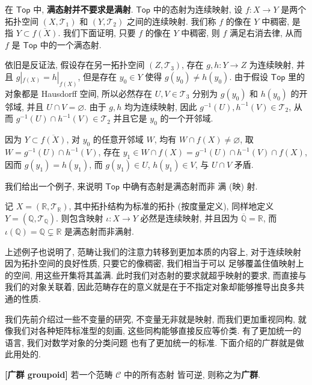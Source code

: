 \documentclass[UTF8]{book}
\begin{document}
\begin{example}
    在 $\mathsf{Top}$ 中, \textbf{满态射并不要求是满射}. 
    $\mathsf{Top}$ 中的态射为连续映射, 设 $f: X \to Y$ 
    是两个拓扑空间 $(X,\mathcal{T}_1)$ 和 $(Y,\mathcal{T}_2)$ 
    之间的连续映射. 
    我们称 $f$ 的像在 $Y$ 中稠密, 是指 $Y \subset \overline{f(X)}$. 
    我们下面证明, 只要 $f$ 的像在 $Y$ 中稠密, 则 $f$ 满足右消去律, 
    从而 $f$ 是 $\mathsf{Top}$ 中的一个满态射. 

    依旧是反证法, 假设存在另一拓扑空间 $(Z,\mathcal{T}_3)$, 
    存在 $g,h : Y \to Z$ 为连续映射, 并且 $g|_{f(X)}=h|_{f(X)}$, 
    但是存在 $y_0 \in Y$ 使得 $g(y_0)\neq h(y_0)$. 
    由于假设 $\mathsf{Top}$ 里的对象都是 Hausdorff 空间, 
    所以必然存在 $U,V \in \mathcal{T}_3$ 分别为 $g(y_0)$ 和 $h(y_0)$ 
    的开邻域, 并且 $U \cap V = \varnothing$. 
    由于 $g,h$ 均为连续映射, 因此 $g^{-1}(U),h^{-1}(V) \in \mathcal{T}_2$, 
    从而 $g^{-1}(U) \cap h^{-1}(V) \in \mathcal{T}_2$ 
    并且它是 $y_0$ 的一个开邻域. 

    因为 $Y \subset \overline{f(X)}$, 对 $y_0$ 的任意开邻域 $W$, 
    均有 $W \cap f(X) \neq \varnothing $, 取 
    $W = g^{-1}(U) \cap h^{-1}(V)$, 存在 
    $y_1 \in W \cap f(X) =g^{-1}(U) \cap h^{-1}(V) \cap f(X)$, 
    因而 $g(y_1) = h(y_1)$, 而 $g(y_1)\in U$, $h(y_1) \in V$, 
    与 $U \cap V$ 矛盾. 

    我们给出一个例子, 来说明 $\mathsf{Top}$ 中确有态射是满态射而非
    满 (映) 射. 
    
    记 $X = (\mathbb{R},\mathcal{T}_{\mathbb{R}})$, 其中拓扑结构为标准的拓扑
     (按度量定义), 同样地定义 
    $Y= (\mathbb{Q},\mathcal{T}_{\mathbb{Q}})$. 
    则包含映射 $\iota : X \to Y$ 必然是连续映射, 
    并且因为 $\overline{\mathbb{Q}}=\mathbb{R}$, 
    而 $\iota(\mathbb{Q})=\mathbb{Q} \subsetneq \mathbb{R}$ 
    是满态射而非满射. 
\end{example}

上述例子也说明了, 范畴让我们的注意力转移到更加本质的内容上, 
对于连续映射因为拓扑空间的良好性质, 只要它的像稠密, 我们相当于可以
足够覆盖住值映射上的空间, 用这些开集将其盖满. 
此时我们对态射的要求就超乎映射的要求, 而直接与我们的对象关联着, 
因此范畴存在的意义就是在于不指定对象却能够推导出良多共通的性质. 

我们先前介绍过一些不变量的研究, 不变量无非就是映射, 
而我们更加重视同构, 就像我们对各种矩阵标准型的刻画, 
这些同构能够直接反应等价类. 有了更加统一的语言, 我们对数学对象的分类问题
也有了更加统一的标准. 下面介绍的广群就是做此用处的. 

\begin{definition}
    \textbf{[广群 groupoid]} 若一个范畴 $\mathcal{C}$ 中的所有态射
    皆可逆, 则称之为\textbf{广群}. 
\end{definition}
\end{document}
